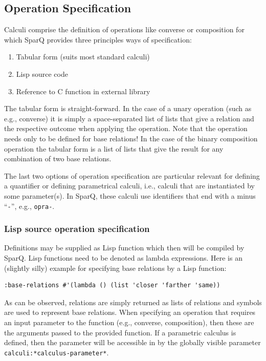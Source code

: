 \documentclass[headsepline]{scrreprt}
\theoremstyle{definition}
\newcommand{\engine}{SparQ}
\begin{document}
\subsection{Operation Specification}

Calculi comprise the definition of operations like converse or composition for which \engine{} provides three principles ways of specification:
\begin{enumerate}
	\item Tabular form (suits most standard calculi)
	\item Lisp source code
	\item Reference to C function in external library
\end{enumerate}

The tabular form is straight-forward. In the case of a unary operation (such as e.g., converse) it is simply a space-separated list of lists that give a relation and the respective outcome when applying the operation. Note that the operation needs only to be defined for base relations! In the case of the binary composition operation the tabular form is a list of lists that give the result for any combination of two base relations.

The last two options of operation specification are particular relevant for defining a quantifier or defining parametrical calculi, i.e., calculi that are instantiated by some parameter(s). In \engine{}, these calculi use identifiers that end with a minus ``{\tt -}'', e.g., {\tt opra-}.


\subsubsection{Lisp source operation specification}

Definitions may be supplied as Lisp function which then will be compiled by \engine{}. Lisp functions need to be denoted as lambda expressions. Here is an (slightly silly) example for specifying base relations by a Lisp function:

\begin{verbatim}
:base-relations #'(lambda () (list 'closer 'farther 'same))
\end{verbatim}

As can be observed, relations are simply returned as lists of relations and symbols are used to represent base relations. When specifying an operation that requires an input parameter to the function (e.g., converse, composition), then these are the arguments passed to the provided function. If a parametric calculus is defined, then the parameter will be accessible in by the globally visible parameter {\tt calculi:*calculus-parameter*}.
\end{document}
